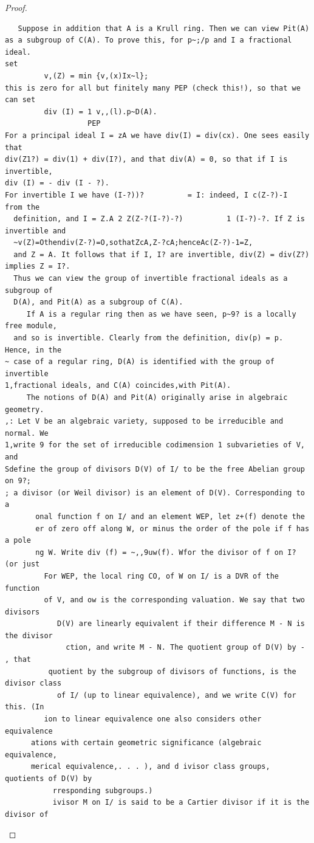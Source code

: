 \begin{proof}
\begin{verbatim}
   Suppose in addition that A is a Krull ring. Then we can view Pit(A)
as a subgroup of C(A). To prove this, for p~;/p and I a fractional ideal.
set
         v,(Z) = min {v,(x)Ix~l};
this is zero for all but finitely many PEP (check this!), so that we can set
         div (I) = 1 v,,(l).p~D(A).
                   PEP
For a principal ideal I = zA we have div(I) = div(cx). One sees easily that
div(Z1?) = div(1) + div(I?), and that div(A) = 0, so that if I is invertible,
div (I) = - div (I - ?).
For invertible I we have (I-?))?          = I: indeed, I c(Z-?)-I       from the
  definition, and I = Z.A 2 Z(Z-?(I-?)-?)          1 (I-?)-?. If Z is invertible and
  ~v(Z)=Othendiv(Z-?)=O,sothatZcA,Z-?cA;henceAc(Z-?)-1=Z,
  and Z = A. It follows that if I, I? are invertible, div(Z) = div(Z?) implies Z = I?.
  Thus we can view the group of invertible fractional ideals as a subgroup of
  D(A), and Pit(A) as a subgroup of C(A).
     If A is a regular ring then as we have seen, p~9? is a locally free module,
  and so is invertible. Clearly from the definition, div(p) = p. Hence, in the
~ case of a regular ring, D(A) is identified with the group of invertible
1,fractional ideals, and C(A) coincides,with Pit(A).
     The notions of D(A) and Pit(A) originally arise in algebraic geometry.
,: Let V be an algebraic variety, supposed to be irreducible and normal. We
1,write 9 for the set of irreducible codimension 1 subvarieties of V, and
Sdefine the group of divisors D(V) of I/ to be the free Abelian group on 9?;
; a divisor (or Weil divisor) is an element of D(V). Corresponding to a
       onal function f on I/ and an element WEP, let z+(f) denote the
       er of zero off along W, or minus the order of the pole if f has a pole
       ng W. Write div (f) = ~,,9uw(f). Wfor the divisor of f on I? (or just
         For WEP, the local ring CO, of W on I/ is a DVR of the function
         of V, and ow is the corresponding valuation. We say that two divisors
            D(V) are linearly equivalent if their difference M - N is the divisor
              ction, and write M - N. The quotient group of D(V) by - , that
          quotient by the subgroup of divisors of functions, is the divisor class
            of I/ (up to linear equivalence), and we write C(V) for this. (In
         ion to linear equivalence one also considers other equivalence
      ations with certain geometric significance (algebraic equivalence,
      merical equivalence,. . . ), and d ivisor class groups, quotients of D(V) by
           rresponding subgroups.)
           ivisor M on I/ is said to be a Cartier divisor if it is the divisor of

\end{verbatim}
\end{proof}
